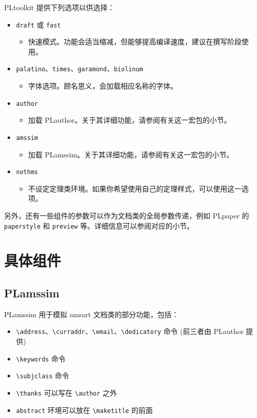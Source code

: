 \documentclass[allowbf]{lebhart}
\providecommand{\PLtoolkit}{\textsf{PLtoolkit}}
\providecommand{\PLamssim}{\textsf{PLamssim}}
\providecommand{\PLauthor}{\textsf{PLauthor}}
\providecommand{\PLpaper}{\textsf{PLpaper}}
\begin{document}
\PLtoolkit{} 提供下列选项以供选择：
\begin{itemize}
    \item \texttt{draft} 或 \texttt{fast}
        \begin{itemize}
            \item 快速模式。功能会适当缩减，但能够提高编译速度，建议在撰写阶段使用。
        \end{itemize}
    \item \texttt{palatino}、\texttt{times}、\texttt{garamond}、\texttt{biolinum}
        \begin{itemize}
            \item 字体选项。顾名思义，会加载相应名称的字体。
        \end{itemize}
    \item \texttt{author}
        \begin{itemize}
            \item 加载 \PLauthor{}。关于其详细功能，请参阅有关这一宏包的小节。
        \end{itemize}
    \item \texttt{amssim}
        \begin{itemize}
            \item 加载 \PLamssim{}。关于其详细功能，请参阅有关这一宏包的小节。
        \end{itemize}
    \item \texttt{nothms}
        \begin{itemize}
            \item 不设定定理类环境。如果你希望使用自己的定理样式，可以使用这一选项。
        \end{itemize}
\end{itemize}
另外，还有一些组件的参数可以作为文档类的全局参数传递，例如 \PLpaper{} 的 \texttt{paperstyle} 和 \texttt{preview} 等。详细信息可以参阅对应的小节。

\section{具体组件}

\subsection{PLamssim}

\PLamssim{} 用于模拟 \textsf{amsart} 文档类的部分功能，包括：
\begin{itemize}
    \item \lstinline|\address|、\lstinline|\curraddr|、\lstinline|\email|、\lstinline|\dedicatory| 命令 (前三者由 \PLauthor{} 提供)
    \item \lstinline|\keywords| 命令
    \item \lstinline|\subjclass| 命令
    \item \lstinline|\thanks| 可以写在 \lstinline|\author| 之外
    \item \lstinline|abstract| 环境可以放在 \lstinline|\maketitle| 的前面
\end{itemize}
\end{document}
